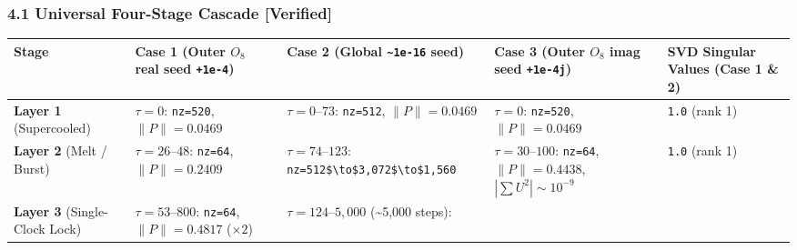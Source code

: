 \documentclass[
  a4paper,
]{article}
\newcounter{none} %
\begin{document}
\subsubsection{4.1 Universal Four-Stage Cascade
{[}Verified{]}}\label{universal-four-stage-cascade-verified}

{\def\LTcaptype{none} %
\begin{longtable}[]{@{}
  >{\raggedright\arraybackslash}p{}
  >{\raggedright\arraybackslash}p{}
  >{\raggedright\arraybackslash}p{}
  >{\raggedright\arraybackslash}p{}
  >{\raggedright\arraybackslash}p{}@{}}
\toprule\noalign{}
\begin{minipage}[b]{\linewidth}\raggedright
Stage
\end{minipage} & \begin{minipage}[b]{\linewidth}\raggedright
Case 1 (Outer \(O_8\) real seed \texttt{+1e-4})
\end{minipage} & \begin{minipage}[b]{\linewidth}\raggedright
Case 2 (Global \texttt{\textasciitilde{}1e-16} seed)
\end{minipage} & \begin{minipage}[b]{\linewidth}\raggedright
Case 3 (Outer \(O_8\) imag seed \texttt{+1e-4j})
\end{minipage} & \begin{minipage}[b]{\linewidth}\raggedright
SVD Singular Values (Case 1 \& 2)
\end{minipage} \\
\midrule\noalign{}
\endhead
\bottomrule\noalign{}
\endlastfoot
\textbf{Layer 1} (Supercooled) & \(\tau=0\): \texttt{nz=520},
\(\|P\|=0.0469\) & \(\tau=0\text{--}73\): \texttt{nz=512},
\(\|P\|=0.0469\) & \(\tau=0\): \texttt{nz=520}, \(\|P\|=0.0469\) &
\texttt{1.0} (rank 1) \\
\textbf{Layer 2} (Melt / Burst) & \(\tau=26\text{--}48\):
\texttt{nz=64}, \(\|P\|=0.2409\) & \(\tau=74\text{--}123\):
\texttt{nz=512\$\textbackslash{}to\$3,072\$\textbackslash{}to\$1,560} &
\(\tau=30\text{--}100\): \texttt{nz=64}, \(\|P\|=0.4438\),
\(|\sum U^2|\sim 10^{-9}\) & \texttt{1.0} (rank 1) \\
\textbf{Layer 3} (Single-Clock Lock) & \(\tau=53\text{--}800\):
\texttt{nz=64}, \(\|P\|=0.4817\) (\(\times 2\)) &
\textbf{\(\tau=124\text{--}5,000\)} (\textasciitilde5,000 steps):

\end{longtable}}
\end{document}
